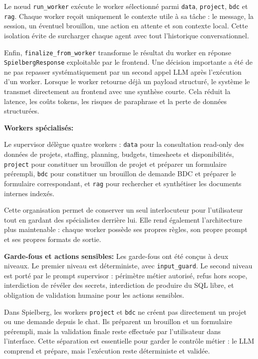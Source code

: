 \documentclass[a4paper,11pt,english,openany]{book}
\begin{document}
Le nœud \texttt{run\_worker} exécute le worker sélectionné parmi \texttt{data}, \texttt{project}, \texttt{bdc} et \texttt{rag}. Chaque worker reçoit uniquement le contexte utile à sa tâche : le message, la session, un éventuel brouillon, une action en attente et son contexte local. Cette isolation évite de surcharger chaque agent avec tout l'historique conversationnel.

Enfin, \texttt{finalize\_from\_worker} transforme le résultat du worker en réponse \texttt{SpielbergResponse} exploitable par le frontend. Une décision importante a été de ne pas repasser systématiquement par un second appel LLM après l'exécution d'un worker. Lorsque le worker retourne déjà un payload structuré, le système le transmet directement au frontend avec une synthèse courte. Cela réduit la latence, les coûts tokens, les risques de paraphrase et la perte de données structurées.

\textbf{Workers spécialisés:}

Le supervisor délègue quatre workers : \texttt{data} pour la consultation read-only des données de projets, staffing, planning, budgets, timesheets et disponibilités, \texttt{project} pour constituer un brouillon de projet et préparer un formulaire prérempli, \texttt{bdc} pour constituer un brouillon de demande BDC et préparer le formulaire correspondant, et \texttt{rag} pour rechercher et synthétiser les documents internes indexés.

Cette organisation permet de conserver un seul interlocuteur pour l'utilisateur tout en gardant des spécialistes derrière lui. Elle rend également l'architecture plus maintenable : chaque worker possède ses propres règles, son propre prompt et ses propres formats de sortie.

\textbf{Garde-fous et actions sensibles:}
Les garde-fous ont été conçus à deux niveaux. Le premier niveau est déterministe, avec 
 \texttt{input\_guard}. Le second niveau est porté par le prompt supervisor : périmètre métier autorisé, refus hors scope, interdiction de révéler des secrets, interdiction de produire du SQL libre, et obligation de validation humaine pour les actions sensibles.

Dans Spielberg, les workers \texttt{project} et \texttt{bdc} ne créent pas directement un projet ou une demande depuis le chat. Ils préparent un brouillon et un formulaire prérempli, mais la validation finale reste effectuée par l'utilisateur dans l'interface. Cette séparation est essentielle pour garder le contrôle métier : le LLM comprend et prépare, mais l'exécution reste déterministe et validée.
\end{document}
